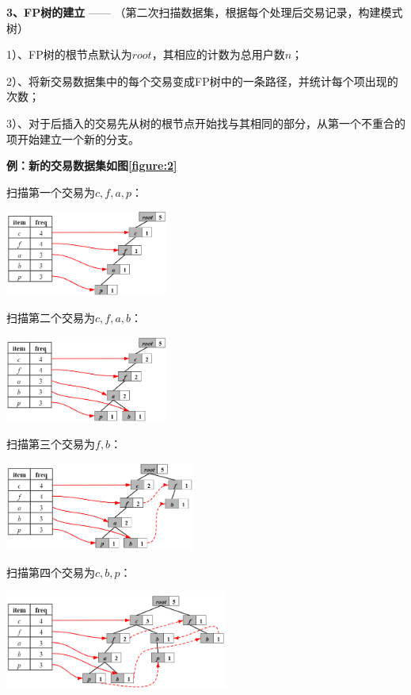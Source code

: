 \documentclass[UTF8,a4paper]{ctexart}
\begin{document}
  \textbf{3、FP树的建立} —— （第二次扫描数据集，根据每个处理后交易记录，构建模式树）

  1）、FP树的根节点默认为$root$，其相应的计数为总用户数$n$；

  2）、将新交易数据集中的每个交易变成FP树中的一条路径，并统计每个项出现的次数；

  3）、对于后插入的交易先从树的根节点开始找与其相同的部分，从第一个不重合的项开始建立一个新的分支。

  \textbf{例：新的交易数据集如图\ref{figure:2}}

  扫描第一个交易为{\color{red}$c,f,a,p$}：

  \includegraphics[width=0.4\textwidth]{1_trans}

  扫描第二个交易为{\color{red}$c,f,a,b$}：
  
  \includegraphics[width=0.4\textwidth]{2_trans}

  扫描第三个交易为{\color{red}$f,b$}：
  
  \includegraphics[width=0.47\textwidth]{3_trans}

  扫描第四个交易为{\color{red}$c,b,p$}：
  
  \includegraphics[width=0.55\textwidth]{4_trans}
\end{document}
